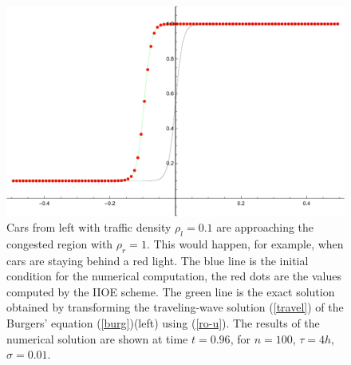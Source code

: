 \documentclass[a4paper,12pt,twoside]{report}%
\begin{document}
\begin{figure}[h!]
	\centering
	\includegraphics[width=\textwidth]{figures/trafficTravel100t.96}
	\caption{Cars from left with traffic density $ \rho_l = 0.1 $ are approaching the congested region with $ \rho_r = 1 $. This would happen, for example, when cars are staying behind a red light. 
	The blue line is the initial condition for the numerical computation, the red dots are the values computed by the IIOE scheme. The green line is the exact solution obtained by transforming the traveling-wave solution {\rm (\ref{travel})} of the Burgers' equation {\rm (\ref{burg})}(left) using {\rm (\ref{ro-u})}. The results of the numerical solution are shown at time $ t = 0.96 $, for $ n = 100 $, $ \tau = 4h $, $ \sigma = 0.01 $.
	}
	\label{fig:traffic_travel}
\end{figure}

\newpage
\end{document}
